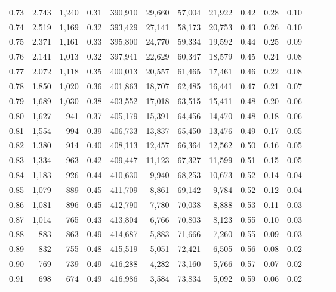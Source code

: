 \begin{tabular}{rrrrrrrrrrrrrr}
0.73 &  2,743 &  1,240 &  0.31 &  390,910 &   29,660 &  57,004 &  21,922 &  0.42 &  0.28 &      0.10 \\
0.74 &  2,519 &  1,169 &  0.32 &  393,429 &   27,141 &  58,173 &  20,753 &  0.43 &  0.26 &      0.10 \\
0.75 &  2,371 &  1,161 &  0.33 &  395,800 &   24,770 &  59,334 &  19,592 &  0.44 &  0.25 &      0.09 \\
0.76 &  2,141 &  1,013 &  0.32 &  397,941 &   22,629 &  60,347 &  18,579 &  0.45 &  0.24 &      0.08 \\
0.77 &  2,072 &  1,118 &  0.35 &  400,013 &   20,557 &  61,465 &  17,461 &  0.46 &  0.22 &      0.08 \\
0.78 &  1,850 &  1,020 &  0.36 &  401,863 &   18,707 &  62,485 &  16,441 &  0.47 &  0.21 &      0.07 \\
0.79 &  1,689 &  1,030 &  0.38 &  403,552 &   17,018 &  63,515 &  15,411 &  0.48 &  0.20 &      0.06 \\
0.80 &  1,627 &    941 &  0.37 &  405,179 &   15,391 &  64,456 &  14,470 &  0.48 &  0.18 &      0.06 \\
0.81 &  1,554 &    994 &  0.39 &  406,733 &   13,837 &  65,450 &  13,476 &  0.49 &  0.17 &      0.05 \\
0.82 &  1,380 &    914 &  0.40 &  408,113 &   12,457 &  66,364 &  12,562 &  0.50 &  0.16 &      0.05 \\
0.83 &  1,334 &    963 &  0.42 &  409,447 &   11,123 &  67,327 &  11,599 &  0.51 &  0.15 &      0.05 \\
0.84 &  1,183 &    926 &  0.44 &  410,630 &    9,940 &  68,253 &  10,673 &  0.52 &  0.14 &      0.04 \\
0.85 &  1,079 &    889 &  0.45 &  411,709 &    8,861 &  69,142 &   9,784 &  0.52 &  0.12 &      0.04 \\
0.86 &  1,081 &    896 &  0.45 &  412,790 &    7,780 &  70,038 &   8,888 &  0.53 &  0.11 &      0.03 \\
0.87 &  1,014 &    765 &  0.43 &  413,804 &    6,766 &  70,803 &   8,123 &  0.55 &  0.10 &      0.03 \\
0.88 &    883 &    863 &  0.49 &  414,687 &    5,883 &  71,666 &   7,260 &  0.55 &  0.09 &      0.03 \\
0.89 &    832 &    755 &  0.48 &  415,519 &    5,051 &  72,421 &   6,505 &  0.56 &  0.08 &      0.02 \\
0.90 &    769 &    739 &  0.49 &  416,288 &    4,282 &  73,160 &   5,766 &  0.57 &  0.07 &      0.02 \\
0.91 &    698 &    674 &  0.49 &  416,986 &    3,584 &  73,834 &   5,092 &  0.59 &  0.06 &      0.02 \\

\end{tabular}
